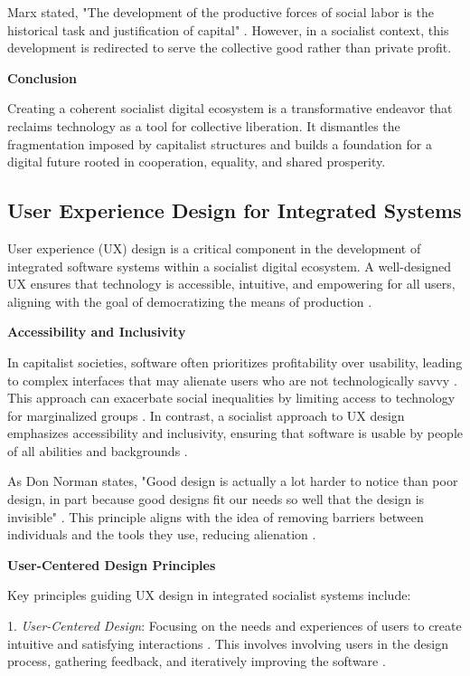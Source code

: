 \begin{refsection}
Marx stated, "The development of the productive forces of social labor is the historical task and justification of capital" \cite[pp.~102]{Marx2008}. However, in a socialist context, this development is redirected to serve the collective good rather than private profit.

\textbf{Conclusion}

Creating a coherent socialist digital ecosystem is a transformative endeavor that reclaims technology as a tool for collective liberation. It dismantles the fragmentation imposed by capitalist structures and builds a foundation for a digital future rooted in cooperation, equality, and shared prosperity.

\subsection{User Experience Design for Integrated Systems}

User experience (UX) design is a critical component in the development of integrated software systems within a socialist digital ecosystem. A well-designed UX ensures that technology is accessible, intuitive, and empowering for all users, aligning with the goal of democratizing the means of production \cite[pp.~714-716]{Marx1867}.

\textbf{Accessibility and Inclusivity}

In capitalist societies, software often prioritizes profitability over usability, leading to complex interfaces that may alienate users who are not technologically savvy \cite[pp.~85-87]{Nielsen1993}. This approach can exacerbate social inequalities by limiting access to technology for marginalized groups \cite[pp.~120-122]{Fuchs2014}. In contrast, a socialist approach to UX design emphasizes accessibility and inclusivity, ensuring that software is usable by people of all abilities and backgrounds \cite[pp.~35-37]{Norman1988}.

As Don Norman states, "Good design is actually a lot harder to notice than poor design, in part because good designs fit our needs so well that the design is invisible" \cite[pp.~24]{Norman1988}. This principle aligns with the idea of removing barriers between individuals and the tools they use, reducing alienation \cite[pp.~74-76]{Marx1844}.

\textbf{User-Centered Design Principles}

Key principles guiding UX design in integrated socialist systems include:

1. \textit{User-Centered Design}: Focusing on the needs and experiences of users to create intuitive and satisfying interactions \cite[pp.~10-12]{Norman1988}. This involves involving users in the design process, gathering feedback, and iteratively improving the software \cite[pp.~85-87]{Preece2015}.


\end{refsection}
